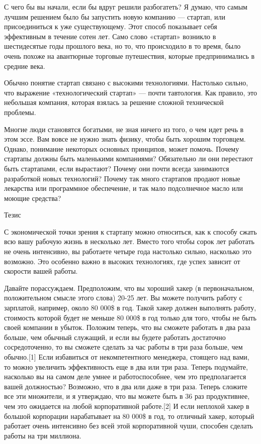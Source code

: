 \documentclass[ebook,12pt,oneside,openany]{memoir}
\begin{document}
\maketitle

С чего бы вы начали, если бы вдруг решили разбогатеть? Я думаю, что
самым лучшим решением было бы запустить новую компанию — стартап, или
присоединиться к уже существующему. Этот способ показывает себя
эффективным в течение сотен лет. Само слово «стартап» возникло в
шестидесятые годы прошлого века, но то, что происходило в то время,
было очень похоже на авантюрные торговые путешествия, которые
предпринимались в средние века.

Обычно понятие стартап связано с высокими технологиями. Настолько
сильно, что выражение «технологический стартап» — почти тавтология.
Как правило, это небольшая компания, которая взялась за решение
сложной технической проблемы.

Многие люди становятся богатыми, не зная ничего из того, о чем идет
речь в этом эссе. Вам вовсе не нужно знать физику, чтобы быть хорошим
торговцем. Однако, понимание некоторых основных принципов, может
помочь. Почему стартапы должны быть маленькими компаниями? Обязательно
ли они перестают быть стартапами, если вырастают? Почему они почти
всегда занимаются разработкой новых технологий? Почему так много
стартапов продают новые лекарства или программное обеспечение, и так
мало подсолнечное масло или моющие средства?

Тезис

С экономической точки зрения к стартапу можно относиться, как к
способу сжать всю вашу рабочую жизнь в несколько лет. Вместо того
чтобы сорок лет работать не очень интенсивно, вы работаете четыре года
настолько сильно, насколько это возможно. Это особенно важно в высоких
технологиях, где успех зависит от скорости вашей работы.

Давайте порассуждаем. Предположим, что вы хороший хакер (в
первоначальном, положительном смысле этого слова) 20-25 лет. Вы можете
получить работу с зарплатой, например, около 80 000\$ в год. Такой
хакер должен выполнять работу, стоимость которой будет не меньше 80
000\$ в год только для того, чтобы не быть своей компании в убыток.
Положим теперь, что вы сможете работать в два раза больше, чем обычный
служащий, и если вы будете работать достаточно сосредоточенно, то вы
сможете сделать за час работы в три раза больше, чем обычно.[1] Если
избавиться от некомпетентного менеджера, стоящего над вами, то можно
увеличить эффективность еще в два или три раза. Теперь подумайте,
насколько вы на самом деле умнее и работоспособнее, чем это
предполагается вашей должностью? Возможно, что в два или даже в три
раза. Теперь сложите все эти множители, и я утверждаю, что вы можете
быть в 36 раз продуктивнее, чем это ожидается на любой корпоративной
работе.[2] И если неплохой хакер в большой корпорации нарабатывает на
80 000\$ в год, то отличный хакер, который работает очень интенсивно
без всей этой корпоративной чуши, способен сделать работы на три
миллиона.
\end{document}
